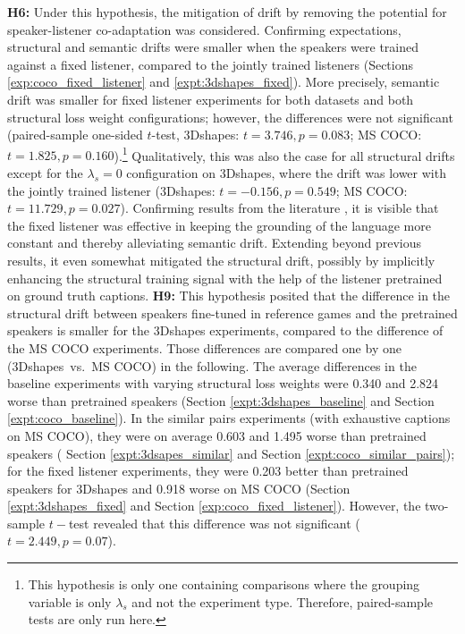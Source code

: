 \textbf{H6:} Under this hypothesis, the mitigation of drift by removing the potential for speaker-listener co-adaptation was considered. Confirming expectations, structural and semantic drifts were smaller when the speakers were trained against a fixed listener, compared to the jointly trained listeners (Sections \ref{exp:coco_fixed_listener} and \ref{expt:3dshapes_fixed}). More precisely, semantic drift was smaller for fixed listener experiments for both datasets and both structural loss weight configurations; however, the differences were not significant (paired-sample one-sided $t$-test,  3Dshapes: $t = 3.746, p = 0.083$; MS COCO: $t = 1.825, p =0.160$).\footnote{This hypothesis is only one containing comparisons where the grouping variable is only $\lambda_s$ and not the experiment type. Therefore, paired-sample tests are only run here.} Qualitatively, this was also the case for all structural drifts except for the $\lambda_s = 0$ configuration on 3Dshapes, where the drift was lower with the jointly trained listener (3Dshapes: $t=-0.156, p=0.549$;  MS COCO: $t = 11.729, p =0.027$). Confirming results from the literature \parencite{lazaridou2020multi}, it is visible that the fixed listener was effective in keeping the grounding of the language more constant and thereby alleviating semantic drift. Extending beyond previous results, it even somewhat mitigated the structural drift, possibly by implicitly enhancing the structural training signal with the help of the listener pretrained on ground truth captions.\newline
\textbf{H9:} This hypothesis posited that the difference in the structural drift between speakers fine-tuned in reference games and the pretrained speakers is smaller for the 3Dshapes experiments, compared to the difference of the MS COCO experiments.
Those differences are compared one by one (3Dshapes~vs.~MS COCO) in the following. The average differences in the baseline experiments with varying structural loss weights were 0.340 and 2.824 worse than pretrained speakers (Section \ref{expt:3dshapes_baseline} and Section \ref{expt:coco_baseline}). In the similar pairs experiments (with exhaustive captions on MS COCO), they were on average 0.603 and 1.495 worse than pretrained speakers ( Section \ref{expt:3dsapes_similar} and Section \ref{expt:coco_similar_pairs}); for the fixed listener experiments, they were 0.203 better than pretrained speakers for 3Dshapes and 0.918 worse on MS COCO (Section \ref{expt:3dshapes_fixed} and Section \ref{exp:coco_fixed_listener}). However, the two-sample $t-$test revealed that this difference was not significant ($t=2.449, p=0.07$).
